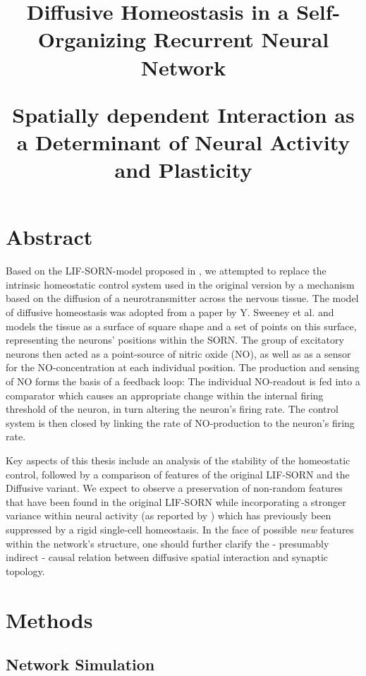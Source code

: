 \documentclass[10pt,a4paper]{article}
\title{Diffusive Homeostasis in a Self-Organizing Recurrent Neural Network \\
\begin{large}
Spatially dependent Interaction as a Determinant of Neural Activity and Plasticity
\end{large}
}
\begin{document}
\maketitle
\section{Abstract} \label{abstract}
Based on the LIF-SORN-model proposed in \cite{SORN_Paper}, we attempted to replace the intrinsic homeostatic control system used in the original version by a mechanism based on the diffusion of a neurotransmitter across the nervous tissue. The model of diffusive homeostasis was adopted from a paper by Y. Sweeney et al. \cite{Sweeney_Paper} and models the tissue as a surface of square shape and a set of points on this surface, representing the neurons' positions within the SORN. The group of excitatory neurons then acted as a point-source of nitric oxide (NO), as well as as a sensor for the NO-concentration at each individual position. The production and sensing of NO forms the basis of a feedback loop: The individual NO-readout is fed into a comparator which causes an appropriate change within the internal firing threshold of the neuron, in turn altering the neuron's firing rate. The control system is then closed by linking the rate of NO-production to the neuron's firing rate.

Key aspects of this thesis include an analysis of the stability of the homeostatic control, followed by a comparison of features of the original LIF-SORN and the Diffusive variant. We expect to observe a preservation of non-random features that have been found in the original LIF-SORN while incorporating a stronger variance within neural activity (as reported by \cite{Sweeney_Paper}) which has previously been suppressed by a rigid single-cell homeostasis. In the face of possible \emph{new} features within the network's structure, one should further clarify the - presumably indirect - causal relation between diffusive spatial interaction and synaptic topology. 





\section{Methods} \label{methods}
\subsection{Network Simulation}
\end{document}
